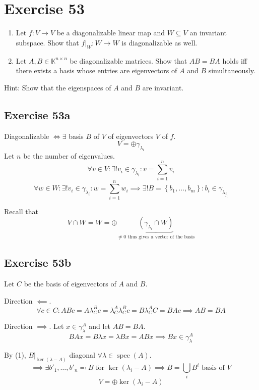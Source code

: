 \documentclass[a4paper]{article}
\theoremstyle{definition}
\newcommand\set[1]{\left\{#1\right\}}
\begin{document}
\section{Exercise 53}
\begin{ex}
  \begin{enumerate}
    \item Let $f: V \to V$ be a diagonalizable linear map and $W \subseteq V$ an invariant subspace. Show that $f|_W: W \to W$ is diagonalizable as well.
    \item Let $A, B \in \mathbb K^{n \times n}$ be diagonalizable matrices. Show that $AB = BA$ holds iff there exists a basis whose entries are eigenvectors of $A$ and $B$ simultaneously.
  \end{enumerate}
  Hint: Show that the eigenspaces of $A$ and $B$ are invariant.
\end{ex}

\subsection{Exercise 53a}

Diagonalizable $\iff \exists$ basis $B$ of $V$ of eigenvectors $V$ of $f$.
\[ V = \oplus \gamma_{\lambda_i} \]
Let $n$ be the number of eigenvalues.
\[ \forall v \in V: \exists! v_i \in \gamma_{\lambda_i}: v = \sum_{i=1}^n v_i \]
\[ \forall w \in W: \exists! v_i \in \gamma_{\lambda_i}: w = \sum_{i=1}^n w_i \implies \exists! B = \set{b_1, \dots, b_m}: b_i \in \gamma_{\lambda_{j_i}} \]

Recall that
\[ V \cap W = W = \oplus \underbrace{(\gamma_{\lambda_i} \cap W)}_{\neq 0 \text{ thus gives a vector of the basis}} \]

\subsection{Exercise 53b}
Let $C$ be the basis of eigenvectors of $A$ and $B$.

Direction $\impliedby$.
\[ \forall c \in C: ABc = A \lambda^B_C c = \lambda_C^A \lambda_C^B c = B \lambda_C^A C = BA c \implies AB = BA \]

Direction $\implies$.
Let $x \in \gamma_\lambda^A$ and let $AB = BA$.
\[ BA x = B \lambda x = \lambda Bx = ABx \implies Bx \in \gamma_{\lambda}^A \]

By (1), $B|_{\ker(\lambda - A)}$ diagonal $\forall \lambda \in \operatorname{spec}(A)$.
\[ \implies \exists b'_1, \dots, b'_n \eqqcolon B \text{ for } \ker(\lambda_i - A) \implies B = \bigcup_i B^i \text{ basis of } V \]
\[ V = \oplus \ker(\lambda_i - A) \]
\end{document}
